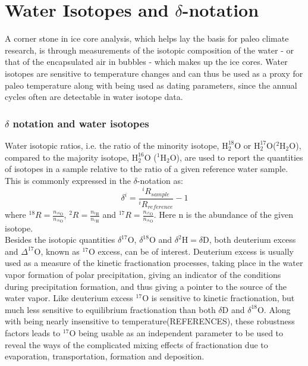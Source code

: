 \documentclass[../../CompleteThesis/Complete_1stDraft.tex]{subfiles}
\begin{document}
\section[Water Isotopes][Water Isotopes]{Water Isotopes and $\delta$-notation}
A corner stone in ice core analysis, which helps lay the basis for paleo climate research, is through measurements of the isotopic composition of the water - or that of the encapsulated air in bubbles - which makes up the ice cores. Water isotopes are sensitive to temperature changes and can thus be used as a proxy for paleo temperature along with being used as dating parameters, since the annual cycles often are detectable in water isotope data.
\subsubsection{$\delta$ notation and water isotopes}
Water isotopic ratios, i.e. the ratio of the minority isotope, ${\text{H}_2^{18}\text{O}}$ or ${\text{H}_2^{17}\text{O}}$($^2\text{H}_2\text{O}$), compared to the majority isotope, ${\text{H}_2^{16}\text{O}}$ ($^1\text{H}_2\text{O}$), are used to report the quantities of isotopes in a sample relative to the ratio of a given reference water sample. This is commonly expressed in the $\delta$-notation as:
\begin{equation}
	\delta^i = \frac{^iR_{sample}}{^iR_{reference}} - 1		
\end{equation}
where $^{18}R = \frac{n_{^{18}\text{O}}}{n_{^{16}\text{O}}}$, $^{2}R = \frac{n_{^{2}\text{H}}}{n_{^{1}\text{H}}}$  and $^{17}R = \frac{n_{^{17}\text{O}}}{n_{^{16}\text{O}}}$. Here n is the abundance of the given isotope.\\
Besides the isotopic quantities $\delta^{17}\text{O}$, $\delta^{18}\text{O}$ and $\delta^2\text{H} = \delta\text{D}$, both deuterium excess and $\Delta^{17}\text{O}$, known as $^{17}\text{O}$ excess, can be of interest. Deuterium excess is usually used as a measure of the kinetic fractionation processes, taking place in the water vapor formation of polar precipitation, giving an indicator of the conditions during precipitation formation, and thus giving a pointer to the source of the water vapor.
Like deuterium excess $^{17}\text{O}$ is sensitive to kinetic fractionation, but much less sensitive to equilibrium fractionation than both $\delta$D and $\delta^{18}$O. Along with being nearly insensitive to temperature(REFERENCES), these robustness factors leads to $^{17}$O being usable as an independent parameter to be used to reveal the ways of the complicated mixing effects of fractionation due to evaporation, transportation, formation and deposition.
\end{document}

